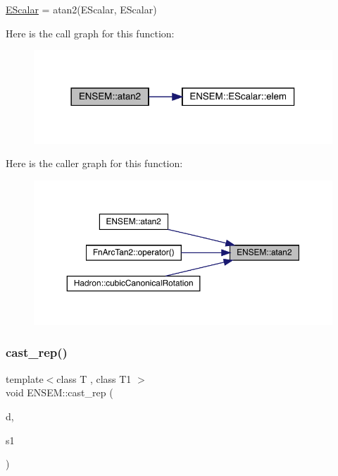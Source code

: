 \mbox{\hyperlink{classENSEM_1_1EScalar}{E\+Scalar}} = atan2(\+E\+Scalar, E\+Scalar) 

Here is the call graph for this function\+:\nopagebreak
\begin{figure}[H]
\begin{center}
\leavevmode
\includegraphics[width=318pt]{d4/dca/group__escalar_ga9a9d48948d119981259ad0ebcb0acfea_cgraph}
\end{center}
\end{figure}
Here is the caller graph for this function\+:\nopagebreak
\begin{figure}[H]
\begin{center}
\leavevmode
\includegraphics[width=350pt]{d4/dca/group__escalar_ga9a9d48948d119981259ad0ebcb0acfea_icgraph}
\end{center}
\end{figure}
\mbox{\label{group__escalar_ga1fe36c2ff072b322fac723a4e44f6584}} 
\subsubsection{\texorpdfstring{cast\_rep()}{cast\_rep()}}
{\footnotesize\ttfamily template$<$class T , class T1 $>$ \\
void E\+N\+S\+E\+M\+::cast\+\_\+rep (\begin{DoxyParamCaption}\item[{T \&}]{d,  }\item[{const \mbox{\hyperlink{classENSEM_1_1EScalar}{E\+Scalar}}$<$ T1 $>$ \&}]{s1 }\end{DoxyParamCaption})\hspace{0.3cm}{\ttfamily [inline]}}



